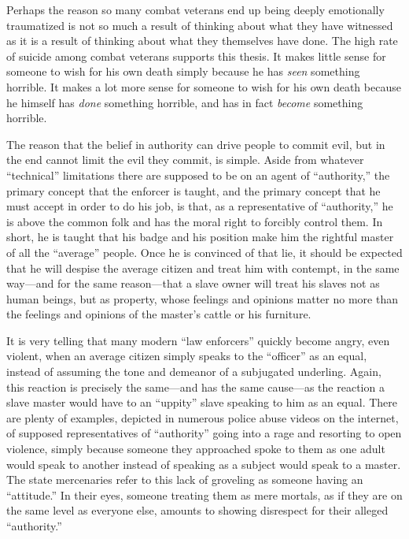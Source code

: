 \documentclass{book}
\begin{document}
Perhaps the reason so many combat veterans end up being deeply emotionally traumatized is not so much a result of thinking about what they have witnessed as it is a result of thinking about what they themselves have done. The high rate of suicide among combat veterans supports this thesis. It makes little sense for someone to wish for his own death simply because he has \emph{seen} something horrible. It makes a lot more sense for someone to wish for his own death because he himself has \emph{done} something horrible, and has in fact \emph{become} something horrible.

The reason that the belief in authority can drive people to commit evil, but in the end cannot limit the evil they commit, is simple. Aside from whatever \enquote{technical} limitations there are supposed to be on an agent of \enquote{authority,} the primary concept that the enforcer is taught, and the primary concept that he must accept in order to do his job, is that, as a representative of \enquote{authority,} he is above the common folk and has the moral right to forcibly control them. In short, he is taught that his badge and his position make him the rightful master of all the \enquote{average} people. Once he is convinced of that lie, it should be expected that he will despise the average citizen and treat him with contempt, in the same way---and for the same reason---that a slave owner will treat his slaves not as human beings, but as property, whose feelings and opinions matter no more than the feelings and opinions of the master's cattle or his furniture.

It is very telling that many modern \enquote{law enforcers} quickly become angry, even violent, when an average citizen simply speaks to the \enquote{officer} as an equal, instead of assuming the tone and demeanor of a subjugated underling. Again, this reaction is precisely the same---and has the same cause---as the reaction a slave master would have to an \enquote{uppity} slave speaking to him as an equal. There are plenty of examples, depicted in numerous police abuse videos on the internet, of supposed representatives of \enquote{authority} going into a rage and resorting to open violence, simply because someone they approached spoke to them as one adult would speak to another instead of speaking as a subject would speak to a master. The state mercenaries refer to this lack of groveling as someone having an \enquote{attitude.} In their eyes, someone treating them as mere mortals, as if they are on the same level as everyone else, amounts to showing disrespect for their alleged \enquote{authority.}
\end{document}
